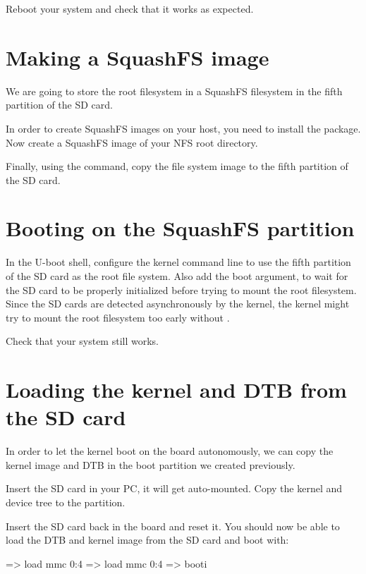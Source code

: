 Reboot your system and check that it works as expected.

\section{Making a SquashFS image}

We are going to store the root filesystem in a SquashFS filesystem in
the fifth partition of the SD card.

In order to create SquashFS images on your host, you need to install
the  package. Now create a SquashFS image of your
NFS root directory.

Finally, using the  command, copy the file system image to
the fifth partition of the SD card.

\section{Booting on the SquashFS partition}

In the U-boot shell, configure the kernel command line to use the
fifth partition of the SD card as the root file system. Also add the
 boot argument, to wait for the SD card to be properly
initialized before trying to mount the root filesystem. Since the SD
cards are detected asynchronously by the kernel, the kernel might try
to mount the root filesystem too early without .

Check that your system still works.

\section{Loading the kernel and DTB from the SD card}

In order to let the kernel boot on the board autonomously, we can
copy the kernel image and DTB in the boot partition we created
previously.

Insert the SD card in your PC, it will get auto-mounted. Copy the
kernel and device tree to the  partition.

Insert the SD card back in the board and reset it. You should now be
able to load the DTB and kernel image from the SD card and boot with:

\begin{ubootinput}
=> load mmc 0:4 %
=> load mmc 0:4 %
=> booti %
\end{ubootinput}

